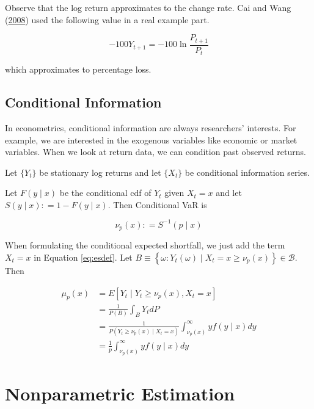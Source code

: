 \documentclass[
]{article}
\theoremstyle{definition}
\theoremstyle{definition}
\theoremstyle{definition}
\theoremstyle{remark}
\let\BeginKnitrBlock\begin \let\EndKnitrBlock\end
\begin{document}
Observe that the log return approximates to the change rate. Cai and Wang (\protect\hyperlink{ref-cai:2008aa}{2008}) used the following value in a real example part.

\[-100 Y_{t + 1} = -100 \ln \frac{P_{t + 1}}{P_t}\]

which approximates to percentage loss.

\hypertarget{conditional-information}{%
\subsection{Conditional Information}\label{conditional-information}}

In econometrics, conditional information are always researchers' interests. For example, we are interested in the exogenous variables like economic or market variables. When we look at return data, we can condition past observed returns.

Let \(\{ Y_t \}\) be stationary log returns and let \(\{ X_t \}\) be conditional information series.

\BeginKnitrBlock{definition}[Conditional Value-at-Risk]
\protect\hypertarget{def:condvar}{}{\label{def:condvar} {} }Let \(F(y \mid x)\) be the conditional cdf of \(Y_t\) given \(X_t = x\) and let \(S(y \mid x) \mathpunct{:}=1 - F(y \mid x)\). Then Conditional VaR is

\[\nu_p(x) \mathpunct{:}=S^{-1}(p \mid x)\]
\EndKnitrBlock{definition}

When formulating the conditional expected shortfall, we just add the term \(X_t = x\) in Equation \eqref{eq:esdef}. Let \(B \equiv \left\{ \omega \mathpunct{:} Y_t(\omega) \mid X_t = x \ge \nu_p(x) \right\} \in \mathcal{B}\). Then

\begin{equation}
  \begin{split}
    \mu_p(x) & = E \left[ Y_t \mid Y_t \ge \nu_p(x), X_t = x \right] \\
    & = \frac{1}{P(B)} \int_{B} Y_t dP \\
    & = \frac{1}{P\left( Y_t \ge \nu_p(x) \mid X_t = x \right)} \int_{\nu_p(x)}^\infty y f(y \mid x) dy \\
    & = \frac{1}{p} \int_{\nu_p(x)}^\infty y f(y \mid x) dy
  \end{split}
  \label{eq:cesformul}
\end{equation}

\hypertarget{nonparam}{%
\section{Nonparametric Estimation}\label{nonparam}}
\end{document}

